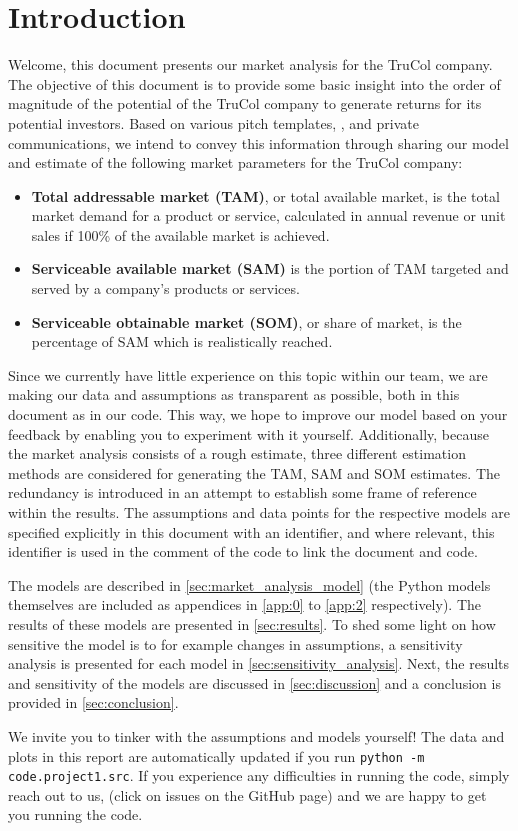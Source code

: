 \section{Introduction}\label{sec:intro}
Welcome, this document presents our market analysis for the TruCol company. The objective of this document is to provide some basic insight into the order of magnitude of the potential of the TruCol company to generate returns for its potential investors. Based on various pitch templates, \cite{kamps2020}, and private communications, we intend to convey this information through sharing our model and estimate of the following market parameters for the TruCol company:

\begin{itemize}
	\item \textbf{Total addressable market (TAM)}, or total available market, is the total market demand for a product or service, calculated in annual revenue or unit sales if 100\% of the available market is achieved\cite{tam_sam_som}.
	\item \textbf{Serviceable available market (SAM)} is the portion of TAM targeted and served by a company's products or services\cite{tam_sam_som}.
	\item \textbf{Serviceable obtainable market (SOM)}, or share of market, is the percentage of SAM which is realistically reached\cite{tam_sam_som}.
\end{itemize}


\noindent Since we currently have little experience on this topic within our team, we are making our data and assumptions as transparent as possible, both in this document as in our code. This way, we hope to improve our model based on your feedback by enabling you to experiment with it yourself. Additionally, because the market analysis consists of a rough estimate, three different estimation methods are considered for generating the TAM, SAM and SOM estimates. The redundancy is introduced in an attempt to establish some frame of reference within the results. %
The assumptions and data points for the respective models are specified explicitly in this document with an identifier, and where relevant, this identifier is used in the comment of the code to link the document and code. 

The models are described in \cref{sec:market_analysis_model} (the Python models themselves are included as appendices in \cref{app:0} to \cref{app:2} respectively). The results of these models are presented in \cref{sec:results}. To shed some light on how sensitive the model is to for example changes in assumptions, a sensitivity analysis is presented for each model in \cref{sec:sensitivity_analysis}. Next, the results and sensitivity of the models are discussed in \cref{sec:discussion} and a conclusion is provided in \cref{sec:conclusion}.

We invite you to tinker with the assumptions and models yourself! The data and plots in this report are automatically updated if you run \verb+python -m code.project1.src+. If you experience any difficulties in running the code, simply reach out to us, (click on issues on the GitHub page) and we are happy to get you running the code.
